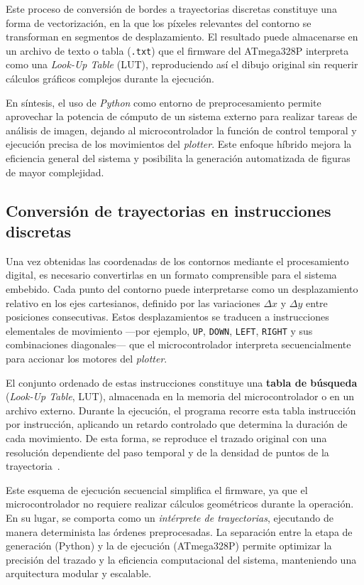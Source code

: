     Este proceso de conversión de bordes a trayectorias discretas constituye una forma de vectorización, en la que los píxeles relevantes del contorno se transforman en segmentos de desplazamiento.  El resultado puede almacenarse en un archivo de texto o tabla (\texttt{.txt}) que el firmware del ATmega328P interpreta como una \textit{Look-Up Table} (LUT), reproduciendo así el dibujo original sin requerir cálculos gráficos complejos durante la ejecución.

    \vspace{1em}

    En síntesis, el uso de \textit{Python} como entorno de preprocesamiento permite aprovechar la potencia de cómputo de un sistema externo para realizar tareas de análisis de imagen, dejando al microcontrolador la función de control temporal y ejecución precisa de los movimientos del \textit{plotter}.  Este enfoque híbrido mejora la eficiencia general del sistema y posibilita la generación automatizada de figuras de mayor complejidad.


\subsection{Conversión de trayectorias en instrucciones discretas}

    Una vez obtenidas las coordenadas de los contornos mediante el procesamiento digital, es necesario convertirlas en un formato comprensible para el sistema embebido.  
    Cada punto del contorno puede interpretarse como un desplazamiento relativo en los ejes cartesianos, definido por las variaciones \(\Delta x\) y \(\Delta y\) entre posiciones consecutivas.  
    Estos desplazamientos se traducen a instrucciones elementales de movimiento —por ejemplo, \texttt{UP}, \texttt{DOWN}, \texttt{LEFT}, \texttt{RIGHT} y sus combinaciones diagonales— que el microcontrolador interpreta secuencialmente para accionar los motores del \textit{plotter}.

    \vspace{1em}

    El conjunto ordenado de estas instrucciones constituye una \textbf{tabla de búsqueda} (\textit{Look-Up Table}, LUT), almacenada en la memoria del microcontrolador o en un archivo externo.  
    Durante la ejecución, el programa recorre esta tabla instrucción por instrucción, aplicando un retardo controlado que determina la duración de cada movimiento.  
    De esta forma, se reproduce el trazado original con una resolución dependiente del paso temporal y de la densidad de puntos de la trayectoria~\cite{williams_make_avr_2014}.

    \vspace{1em}

    Este esquema de ejecución secuencial simplifica el firmware, ya que el microcontrolador no requiere realizar cálculos geométricos durante la operación.  
    En su lugar, se comporta como un \textit{intérprete de trayectorias}, ejecutando de manera determinista las órdenes preprocesadas.  
    La separación entre la etapa de generación (Python) y la de ejecución (ATmega328P) permite optimizar la precisión del trazado y la eficiencia computacional del sistema, manteniendo una arquitectura modular y escalable.
